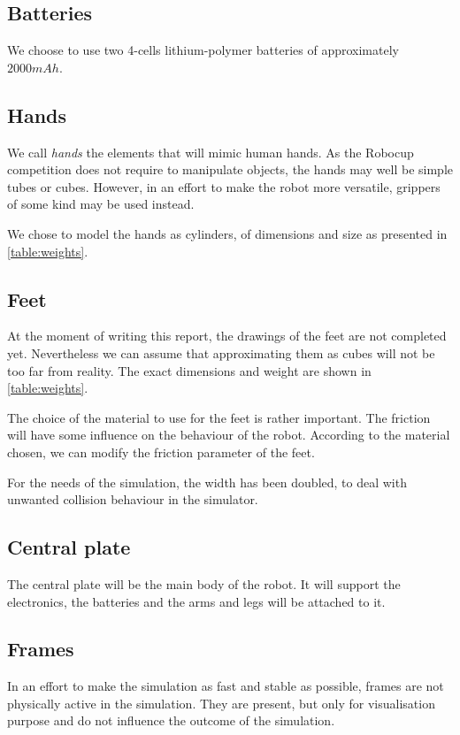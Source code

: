 \subsection{Batteries}
We choose to use two 4-cells lithium-polymer batteries of approximately $2000mAh$.

\subsection{Hands}
We call \emph{hands} the elements that will mimic human hands. As the Robocup competition does not require to manipulate objects, the hands may well be simple tubes or cubes. However, in an effort to make the robot more versatile, grippers of some kind may be used instead.

We chose to model the hands as cylinders, of dimensions and size as presented in \cref{table:weights}.

\subsection{Feet}
At the moment of writing this report, the drawings of the feet are not completed yet. Nevertheless we can assume that approximating them as cubes will not be too far from reality. The exact dimensions and weight are shown in \cref{table:weights}.

The choice of the material to use for the feet is rather important. The friction will have some influence on the behaviour of the robot. According to the material chosen, we can modify the friction parameter of the feet.

For the needs of the simulation, the width has been doubled, to deal with unwanted collision behaviour in the simulator. 

\subsection{Central plate}
The central plate will be the main body of the robot. It will support the electronics, the batteries and the arms and legs will be attached to it.

\subsection{Frames}
In an effort to make the simulation as fast and stable as possible, frames are not physically active in the simulation. They are present, but only for visualisation purpose and do not influence the outcome of the simulation.

